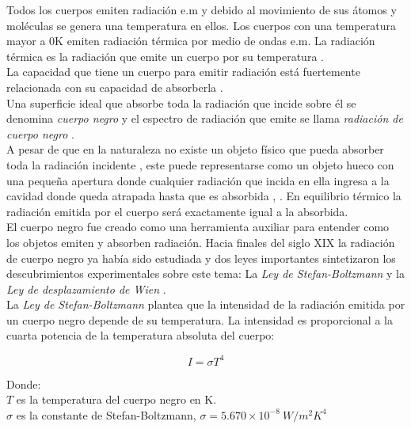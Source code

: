     Todos los cuerpos emiten radiación e.m  y debido al movimiento de sus átomos y moléculas se genera una temperatura en ellos. Los cuerpos con una temperatura mayor a 0K emiten radiación térmica por medio de ondas e.m. La radiación térmica es la radiación que emite un cuerpo por su temperatura \cite{Hollands}.\\
    La capacidad que tiene un cuerpo para emitir radiación está fuertemente relacionada con su capacidad de absorberla \cite{Beiser}.\\
    Una superficie ideal que absorbe toda la radiación que incide sobre él se denomina \textit{cuerpo negro} y el espectro de radiación que emite se llama \textit{radiación de cuerpo negro} \cite{Sears}.\\
    A pesar de que en la naturaleza no existe un objeto físico que pueda absorber toda la radiación incidente \cite{FUV3}, este puede representarse como un objeto hueco con una pequeña apertura donde cualquier radiación que incida en ella ingresa a la cavidad donde queda atrapada hasta que es absorbida \cite{Beiser}, \cite{FUV3}. En equilibrio térmico la radiación emitida por el cuerpo será exactamente igual a la absorbida.\\
    El cuerpo negro fue creado como una herramienta auxiliar para entender como los objetos emiten y absorben radiación.
    Hacia finales del siglo XIX la radiación de cuerpo negro ya había sido estudiada y dos leyes importantes sintetizaron los descubrimientos experimentales sobre este tema: La \textit{Ley de Stefan-Boltzmann} y la \textit{Ley de desplazamiento de Wien} \cite{FUV3}.\\
    
    La \textit{Ley de Stefan-Boltzmann} plantea que la intensidad de la radiación emitida por un cuerpo negro depende de su temperatura. La intensidad es proporcional a la cuarta potencia de la temperatura absoluta del cuerpo:
    
    \begin{equation}
        I = \sigma T^{4}
        \label{eq:Stefan-Boltzmann}
    \end{equation}
    
    Donde:\\
    $T$ es la temperatura del cuerpo negro en K.\\
    $\sigma$ es la constante de Stefan-Boltzmann, $\sigma = 5.670\times10^{-8}\ W/m^{2}K^{4}$\\
    
